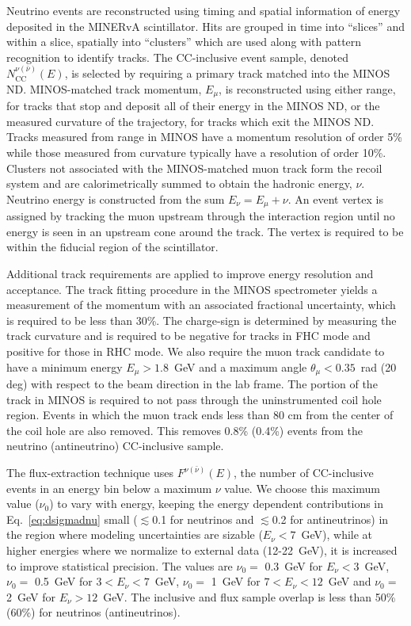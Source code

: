 \documentclass[aps,preprint,showpacs,superscriptaddress,linenumbers,nofootinbib,prd,12pt]{revtex4}
\newcommand{\minerva}{MINERvA\xspace}
\newcommand{\ncc}{\ensuremath{N_\mathrm{CC}^{\nu(\bar{\nu})}(E)}}
\newcommand{\fsam}{\ensuremath{F^{\nu(\bar{\nu})}(E)}}
\begin{document}
Neutrino events are reconstructed using timing and spatial 
information of energy deposited in the \minerva  scintillator.
Hits are grouped in time into ``slices'' and within a slice, spatially into 
``clusters'' which are used along with pattern recognition to identify tracks.
The CC-inclusive event sample, denoted \ncc{}, is selected by requiring a primary 
track matched into the MINOS ND. MINOS-matched track 
momentum, $E_\mu$, is reconstructed using either range, for tracks that stop and deposit 
all of their energy in the MINOS ND, or the measured curvature of 
the trajectory, for tracks which exit the MINOS ND.
Tracks measured from range in MINOS have a momentum resolution of order 5\% while those 
measured from curvature typically have a resolution of order 10\%.
Clusters not associated with the MINOS-matched muon track form the recoil system and
are calorimetrically summed to obtain the hadronic energy, $\nu$.
Neutrino energy is constructed from the sum $E_\nu= E_\mu + \nu$. 
An event vertex is assigned by tracking the muon upstream
through the interaction region until no energy is
seen in an upstream cone around the track. The vertex is required to be within the fiducial region of the scintillator.

Additional track requirements are applied to improve energy resolution and acceptance.
The track fitting procedure in the MINOS spectrometer yields a measurement of the 
momentum
with an associated fractional uncertainty, which is required to be less than 30\%.  
The charge-sign is determined by measuring the track curvature and is required to be negative for tracks in FHC mode and positive for those in RHC mode. 
We also require the 
muon track candidate to have a minimum energy $E_{\mu}>1.8$~GeV and a maximum angle 
$\theta_\mu<0.35$~rad (20 deg) with respect to the beam direction in the lab frame. 
The portion of the track in MINOS is required to not pass through the uninstrumented coil hole region.
Events in which the muon track ends less than 80 cm from the center of the coil hole are also removed.
This removes 0.8\% (0.4\%) events from the neutrino (antineutrino) CC-inclusive sample.

The flux-extraction technique uses $\fsam{}$, the number of CC-inclusive events in an energy bin 
below a
maximum $\nu$ value. 
We choose this maximum value ($\nu_0$) to vary with energy, keeping the energy dependent
contributions in Eq.~\eqref{eq:dsigmadnu}
small ($\lesssim$0.1 for neutrinos and $\lesssim$0.2 for antineutrinos)
in the region where  modeling uncertainties are sizable ($E_\nu< 7$~GeV), while at higher energies where we normalize to external data (12-22~GeV), it is 
increased to improve statistical precision. 
The values are  $\nu_0 =$ 0.3~GeV for $E_\nu<3$~GeV, $\nu_0 =$ 0.5~GeV for $3<E_\nu<7$~GeV, 
$\nu_0 =$ 1~GeV for $7<E_\nu<12$~GeV and $\nu_0 =$ 2~GeV for $E_\nu>12$~GeV.
The inclusive and flux sample overlap is less than 50\% (60\%) for neutrinos (antineutrinos).
\end{document}
